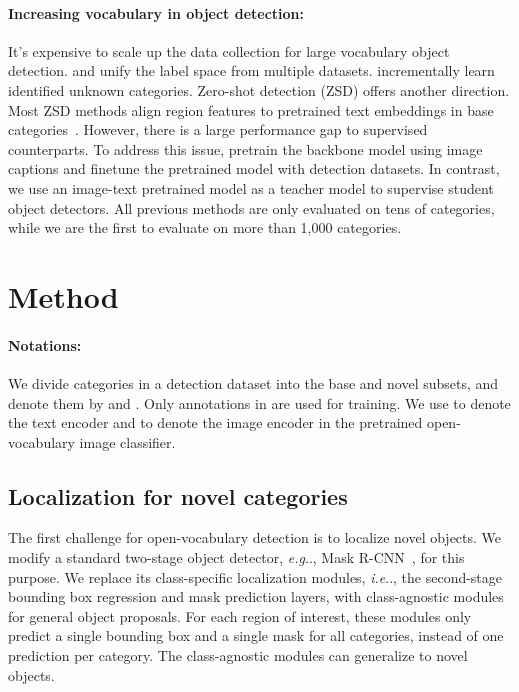 \documentclass{article} \usepackage{iclr2022_conference,times}
\makeatletter
\DeclareRobustCommand\onedot{\futurelet\@let@token\@onedot}
\def\@onedot{\ifx\@let@token.\else.\null\fi\xspace}
\def\eg{\emph{e.g}\onedot} \def\Eg{\emph{E.g}\onedot}
\def\ie{\emph{i.e}\onedot} \def\Ie{\emph{I.e}\onedot}
\makeatother
\begin{document}
\paragraph{Increasing vocabulary in object detection:}
It's expensive to scale up the data collection for large vocabulary object detection.
\citet{zhao2020object} and \citet{zhou2021simple} unify the label space from multiple datasets. \citet{joseph2021towards} incrementally learn identified unknown categories.
Zero-shot detection (ZSD) offers another direction. Most ZSD methods align region features to pretrained text embeddings in base categories~\citep{bansal2018zero,demirel2018zero,rahman2019transductive,hayat2020synthesizing,zheng2020background}. However, there is a large performance gap to supervised counterparts. To address this issue, \citet{zareian2021openvocabulary} pretrain the backbone model using image captions and finetune the pretrained model with detection datasets. In contrast, we use an image-text pretrained model as a teacher model to supervise student object detectors.
All previous methods are only evaluated on tens of categories, while we are the first to evaluate on more than 1,000 categories. 



\section{Method}
\label{sec:methold}

\vspace{-5pt}
\paragraph{Notations:} We divide categories in a detection dataset into the base and novel subsets, and denote them by  and . Only annotations in  are used for training. We use  to denote the text encoder and  to denote the image encoder in the pretrained open-vocabulary image classifier.




\subsection{Localization for novel categories}\label{subsec:method_localization}
The first challenge for open-vocabulary detection is to localize novel objects.
We modify a standard two-stage object detector, \eg, Mask R-CNN~\citep{he2017mask}, for this purpose. 
We replace its class-specific localization modules, \ie, the second-stage bounding box regression and mask prediction layers, with class-agnostic modules for general object proposals.
For each region of interest, these modules only predict a single bounding box and a single mask for all categories, instead of one prediction per category.
The class-agnostic modules can generalize to novel objects.
\end{document}
